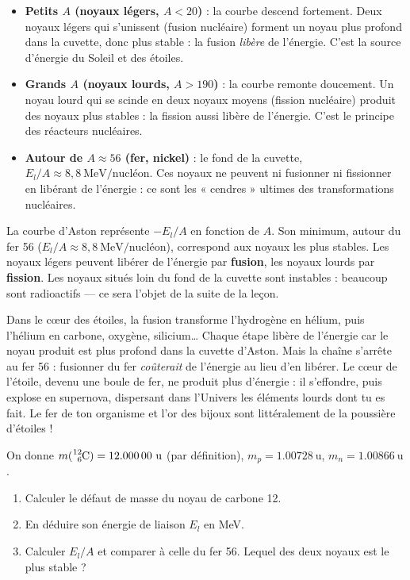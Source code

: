 \documentclass[11pt]{article}
\newcommand{\cle}[1]{{\popxbold\color{popdark}#1}}
\begin{document}
\begin{itemize}
\item \textbf{Petits $A$ (noyaux légers, $A < 20$)} : la courbe descend fortement. Deux noyaux légers qui s'unissent (\cle{fusion nucléaire}) forment un noyau plus profond dans la cuvette, donc plus stable : la fusion \emph{libère} de l'énergie. C'est la source d'énergie du Soleil et des étoiles.
\item \textbf{Grands $A$ (noyaux lourds, $A > 190$)} : la courbe remonte doucement. Un noyau lourd qui se scinde en deux noyaux moyens (\cle{fission nucléaire}) produit des noyaux plus stables : la fission aussi libère de l'énergie. C'est le principe des réacteurs nucléaires.
\item \textbf{Autour de $A \approx 56$ (fer, nickel)} : le fond de la cuvette, $E_l/A \approx 8,8\ \text{MeV/nucléon}$. Ces noyaux ne peuvent ni fusionner ni fissionner en libérant de l'énergie : ce sont les « cendres » ultimes des transformations nucléaires.
\end{itemize}

\begin{aretenir}
La courbe d'Aston représente $-E_l/A$ en fonction de $A$. Son minimum, autour du fer 56 ($E_l/A \approx 8,8\ \text{MeV/nucléon}$), correspond aux noyaux les plus stables. Les noyaux légers peuvent libérer de l'énergie par \textbf{fusion}, les noyaux lourds par \textbf{fission}. Les noyaux situés loin du fond de la cuvette sont instables : beaucoup sont radioactifs — ce sera l'objet de la suite de la leçon.
\end{aretenir}

\begin{savaistu}
Dans le cœur des étoiles, la fusion transforme l'hydrogène en hélium, puis l'hélium en carbone, oxygène, silicium\ldots{} Chaque étape libère de l'énergie car le noyau produit est plus profond dans la cuvette d'Aston. Mais la chaîne s'arrête au fer 56 : fusionner du fer \emph{coûterait} de l'énergie au lieu d'en libérer. Le cœur de l'étoile, devenu une boule de fer, ne produit plus d'énergie : il s'effondre, puis explose en supernova, dispersant dans l'Univers les éléments lourds dont tu es fait. Le fer de ton organisme et l'or des bijoux sont littéralement de la poussière d'étoiles !
\end{savaistu}

\begin{exercice}
On donne $m(\ce{^{12}_{6}C}) = \num{12,00000}\ \text{u}$ (par définition), $m_p = \num{1,00728}\ \text{u}$, $m_n = \num{1,00866}\ \text{u}$.
\begin{enumerate}
\item Calculer le défaut de masse du noyau de carbone 12.
\item En déduire son énergie de liaison $E_l$ en MeV.
\item Calculer $E_l/A$ et comparer à celle du fer 56. Lequel des deux noyaux est le plus stable ?
\end{enumerate}
\end{exercice}
\end{document}
